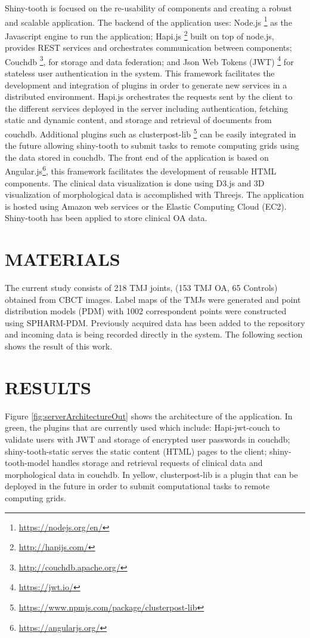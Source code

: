 \documentclass[]{spie}  %
\begin{document}
Shiny-tooth is focused on the re-usability of components and creating a robust and scalable application. 
The backend of the application uses: Node.js \footnote{\url{https://nodejs.org/en/}} as the Javascript engine to run the application; Hapi.js \footnote{\url{http://hapijs.com/}} built on top of node.js, provides REST services and orchestrates communication between components; Couchdb \footnote{\url{http://couchdb.apache.org/}}, for storage and data federation; and Json Web Tokens (JWT) \footnote{\url{https://jwt.io/}} for stateless user authentication in the system.
This framework facilitates the development and integration of plugins in order to generate new services 
in a distributed environment. Hapi.js orchestrates the requests sent by the client 
to the different services deployed in the server including authentication, fetching static and dynamic content, and storage and retrieval of documents from couchdb. Additional plugins such as clusterpost-lib \footnote{\url{https://www.npmjs.com/package/clusterpost-lib}} can be easily integrated in the future allowing shiny-tooth to submit tasks to remote computing grids using the data stored in couchdb.
The front end of the application is based on Angular.js\footnote{\url{https://angularjs.org/}}, this framework facilitates the development of reusable HTML components.
The clinical data visualization is done using D3.js and 3D visualization of morphological data is accomplished with Threejs.
The application is hosted using Amazon web services or the Elastic Computing Cloud (EC2). Shiny-tooth has been applied to store clinical OA data. 

\section{MATERIALS}

The current study consists of 218 TMJ joints, (153 TMJ OA, 65 Controls) obtained from CBCT 
images. Label maps of the TMJs were generated and point distribution models (PDM) with 1002 correspondent 
points were constructed using SPHARM-PDM\cite{Styner2006}. Previously acquired data has been added to the repository and incoming data is being recorded directly in the system.
The following section shows the result of this work. 

\section{RESULTS} 

Figure \ref{fig:serverArchitectureOut} shows the architecture of the application. In green, the plugins that are currently used which include: Hapi-jwt-couch to validate users with JWT and storage of encrypted user passwords in couchdb; shiny-tooth-static serves the static content (HTML) pages to the client; shiny-tooth-model handles storage and retrieval requests of clinical data and morphological data in couchdb. 
In yellow, clusterpost-lib is a plugin that can be deployed in the future in order to submit computational tasks to remote computing grids. 
\end{document}
